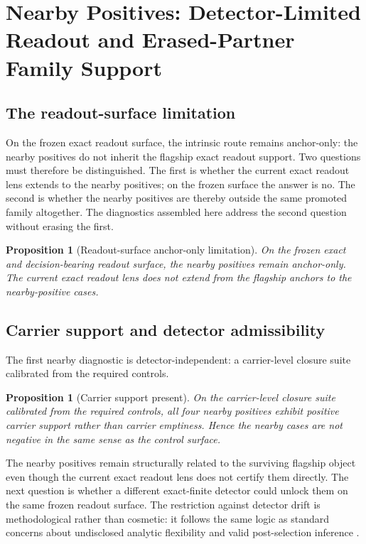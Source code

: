 \documentclass[11pt]{article}
\newtheorem{proposition}[theorem]{Proposition}
\theoremstyle{definition}
\begin{document}
 \section{Nearby Positives: Detector-Limited Readout and Erased-Partner Family Support}

\subsection{The readout-surface limitation}

On the frozen exact readout surface, the intrinsic route remains anchor-only: the nearby positives do not inherit the flagship exact readout support. Two questions must therefore be distinguished. The first is whether the current exact readout lens extends to the nearby positives; on the frozen surface the answer is no. The second is whether the nearby positives are thereby outside the same promoted family altogether. The diagnostics assembled here address the second question without erasing the first.

\begin{proposition}[Readout-surface anchor-only limitation]
\label{prop:nearby-anchor-only}
On the frozen exact and decision-bearing readout surface, the nearby positives remain anchor-only. The current exact readout lens does not extend from the flagship anchors to the nearby-positive cases.
\end{proposition}

\subsection{Carrier support and detector admissibility}

The first nearby diagnostic is detector-independent: a carrier-level closure suite calibrated from the required controls.

\begin{proposition}[Carrier support present]
\label{prop:nearby-carrier-support}
On the carrier-level closure suite calibrated from the required controls, all four nearby positives exhibit positive carrier support rather than carrier emptiness. Hence the nearby cases are not negative in the same sense as the control surface.
\end{proposition}

The nearby positives remain structurally related to the surviving flagship object even though the current exact readout lens does not certify them directly. The next question is whether a different exact-finite detector could unlock them on the same frozen readout surface. The restriction against detector drift is methodological rather than cosmetic: it follows the same logic as standard concerns about undisclosed analytic flexibility and valid post-selection inference \cite{SimmonsNelsonSimonsohn2011,GelmanLoken2013,BerkBrownBujaZhangZhao2013}.
\end{document}
